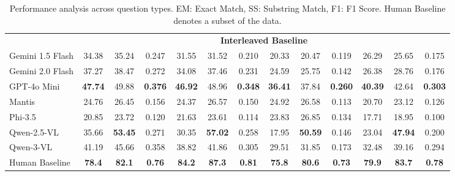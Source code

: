 \documentclass[11pt]{article}
\begin{document}
\begin{table}[t]
\begin{tabular}{lccc|ccc|ccc|ccc}
\cmidrule{2-13}
& \multicolumn{12}{c}{\textbf{Interleaved Baseline}} \\
\cmidrule{2-13}
Gemini 1.5 Flash & 34.38 & 35.24 & 0.247 & 31.55 & 31.52 & 0.210 & 20.33 & 20.47 & 0.119 & 26.29 & 25.65 & 0.175 \\
Gemini 2.0 Flash & 37.27 & 38.47 & 0.272 & 34.08 & 37.46 & 0.231 & 24.59 & 25.75 & 0.142 & 26.38 & 28.76 & 0.176 \\
GPT-4o Mini & \cellcolor{yellow}\textbf{47.74} & 49.88 & \cellcolor{yellow}\textbf{0.376} & \cellcolor{yellow}\textbf{46.92} & 48.96 & \cellcolor{yellow}\textbf{0.348} & \cellcolor{yellow}\textbf{36.41} & 37.84 & \cellcolor{yellow}\textbf{0.260} & \cellcolor{yellow}\textbf{40.39} & 42.64 & \cellcolor{yellow}\textbf{0.303} \\
Mantis & 24.76 & 26.45 & 0.156 & 24.37 & 26.57 & 0.150 & 24.92 & 26.58 & 0.113 & 20.70 & 23.12 & 0.126 \\
Phi-3.5 & 20.85 & 23.72 & 0.120 & 21.63 & 23.61 & 0.114 & 23.83 & 26.85 & 0.134 & 17.71 & 18.95 & 0.100 \\
Qwen-2.5-VL & 35.66 & \cellcolor{yellow}\textbf{53.45} & 0.271 & 30.35 & \cellcolor{yellow}\textbf{57.02} & 0.258 & 17.95 & \cellcolor{yellow}\textbf{50.59} & 0.146 & 23.04 & \cellcolor{yellow}\textbf{47.94} & 0.200 \\
Qwen-3-VL & 41.19 & 45.66 & 0.358 & 38.82 & 41.86 & 0.305 & 29.51 & 31.85 & 0.173 & 32.48 & 39.16 & 0.294 \\
\cmidrule{2-13}
Human Baseline & \textbf{78.4} & \textbf{82.1} & \textbf{0.76} & \textbf{84.2} & \textbf{87.3} & \textbf{0.81} & \textbf{75.8} & \textbf{80.6} & \textbf{0.73} & \textbf{79.9} & \textbf{83.7} & \textbf{0.78} \\
\bottomrule
\end{tabular}
\vspace{-0.5em}
\caption{\small Performance analysis across question types. EM: Exact Match, SS: Substring Match, F1: F1 Score. Human Baseline denotes a subset of the data.}
\label{tab:question_types_results}
\vspace{-1em}
\end{table}
\end{document}
